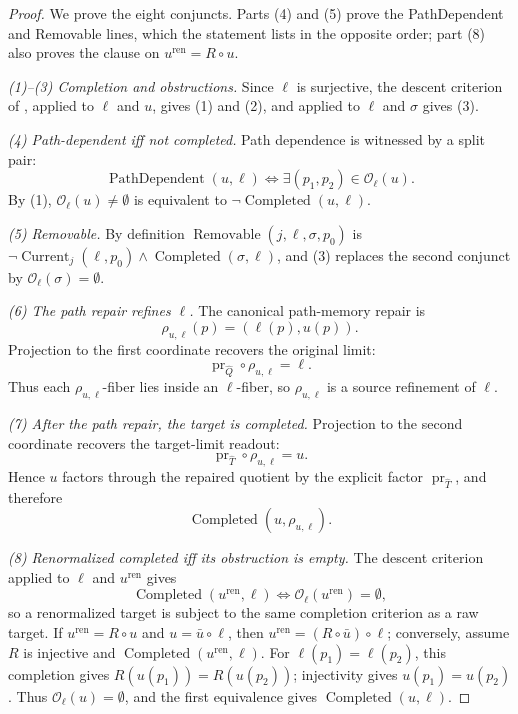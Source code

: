 \begin{proof}
We prove the eight conjuncts. Parts (4) and (5) prove the PathDependent and Removable lines, which the statement lists in the opposite order; part (8) also proves the clause on \(u^{\mathrm{ren}}=R\circ u\).

\emph{(1)--(3) Completion and obstructions.}
Since \(\ell\) is surjective, the descent criterion of
, applied to \(\ell\) and \(u\), gives (1) and (2),
and applied to \(\ell\) and \(\sigma\) gives (3).

\emph{(4) Path-dependent iff not completed.}
Path dependence is witnessed by a split pair:
\[
  \operatorname{PathDependent}(u,\ell)
  \iff
  \exists(p_1,p_2)\in\mathcal O_{\ell}(u).
\]
By (1), \(\mathcal O_{\ell}(u)\ne\emptyset\) is equivalent to
\(\neg\operatorname{Completed}(u,\ell)\).

\emph{(5) Removable.}
By definition \(\operatorname{Removable}(j,\ell,\sigma,p_0)\) is
\(\neg\operatorname{Current}_{j}(\ell,p_0)\wedge\operatorname{Completed}(\sigma,\ell)\),
and (3) replaces the second conjunct by \(\mathcal O_{\ell}(\sigma)=\emptyset\).

\emph{(6) The path repair refines \(\ell\).}
The canonical path-memory repair is
\[
  \rho_{u,\ell}(p)=(\ell(p),u(p)).
\]
Projection to the first coordinate recovers the original limit:
\[
  \operatorname{pr}_{\widehat Q}\circ\rho_{u,\ell}=\ell.
\]
Thus each \(\rho_{u,\ell}\)-fiber lies inside an \(\ell\)-fiber, so
\(\rho_{u,\ell}\) is a source refinement of \(\ell\).

\emph{(7) After the path repair, the target is completed.}
Projection to the second coordinate recovers the target-limit readout:
\[
  \operatorname{pr}_{\widehat T}\circ\rho_{u,\ell}=u.
\]
Hence \(u\) factors through the repaired quotient by the explicit
factor \(\operatorname{pr}_{\widehat T}\), and therefore
\[
  \operatorname{Completed}(u,\rho_{u,\ell}).
\]

\emph{(8) Renormalized completed iff its obstruction is empty.}
The descent criterion applied to \(\ell\) and \(u^{\mathrm{ren}}\) gives
\[
  \operatorname{Completed}(u^{\mathrm{ren}},\ell)
  \iff
  \mathcal O_{\ell}(u^{\mathrm{ren}})=\emptyset,
\]
so a renormalized target is subject to the same completion criterion
as a raw target. If \(u^{\mathrm{ren}}=R\circ u\) and \(u=\bar u\circ\ell\), then
\(u^{\mathrm{ren}}=(R\circ\bar u)\circ\ell\); conversely, assume \(R\) is injective
and \(\operatorname{Completed}(u^{\mathrm{ren}},\ell)\). For \(\ell(p_1)=\ell(p_2)\),
this completion gives \(R(u(p_1))=R(u(p_2))\); injectivity gives
\(u(p_1)=u(p_2)\). Thus \(\mathcal O_\ell(u)=\emptyset\), and the first
equivalence gives \(\operatorname{Completed}(u,\ell)\).
\end{proof}

